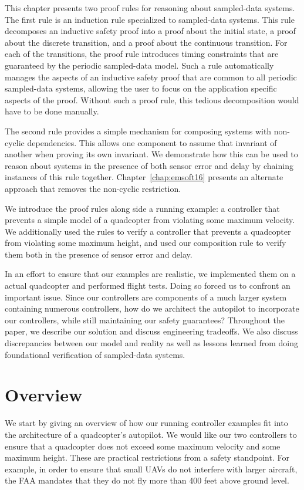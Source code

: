 This chapter presents two proof rules for reasoning about sampled-data
systems. The first rule is an induction rule specialized to sampled-data
systems. This rule decomposes an inductive safety proof into a proof about
the initial state, a proof about the discrete transition, and a proof about
the continuous transition. For each of the transitions, the proof rule
introduces timing constraints that are guaranteed by the periodic
sampled-data model. Such a rule automatically manages the aspects of an
inductive safety proof that are common to all periodic sampled-data
systems, allowing the user to focus on the application specific aspects of
the proof. Without such a proof rule, this tedious decomposition would have
to be done manually.

The second rule provides a simple mechanism for composing systems with
non-cyclic dependencies. This allows one component to assume that invariant
of another when proving its own invariant. We demonstrate how this can be
used to reason about systems in the presence of both sensor error and delay
by chaining instances of this rule together. Chapter~\ref{chap:emsoft16}
presents an alternate approach that removes the non-cyclic restriction.

We introduce the proof rules along side a running example: a controller
that prevents a simple model of a quadcopter from violating some maximum
velocity. We additionally used the rules to verify a controller that
prevents a quadcopter from violating some maximum height, and used our
composition rule to verify them both in the presence of sensor error and
delay.

In an effort to ensure that our examples are realistic, we implemented them
on a actual quadcopter and performed flight tests. Doing so forced us to
confront an important issue. Since our controllers are components of a much
larger system containing numerous controllers, how do we architect the
autopilot to incorporate our controllers, while still maintaining our
safety guarantees? Throughout the paper, we describe our solution and
discuss engineering tradeoffs. We also discuss discrepancies between our
model and reality as well as lessons learned from doing foundational
verification of sampled-data systems.

\section{Overview}
We start by giving an overview of how our running controller examples fit
into the architecture of a quadcopter's autopilot. We would like our two
controllers to ensure that a quadcopter does not exceed some maximum
velocity and some maximum height. These are practical restrictions from a
safety standpoint. For example, in order to ensure that small UAVs do not
interfere with larger aircraft, the FAA mandates that they do not fly more
than 400 feet above ground level.

